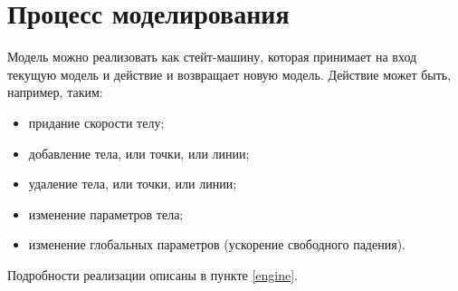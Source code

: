 \section{Процесс моделирования}

Модель можно реализовать как стейт-машину, которая принимает на вход
текущую модель и действие и возвращает новую модель. Действие может быть, например, таким:

\begin{itemize}
  \item придание скорости телу;
  \item добавление тела, или точки, или линии;
  \item удаление тела, или точки, или линии;
  \item изменение параметров тела;
  \item изменение глобальных параметров (ускорение свободного падения).
\end{itemize}

Подробности реализации описаны в пункте \ref{engine}.
